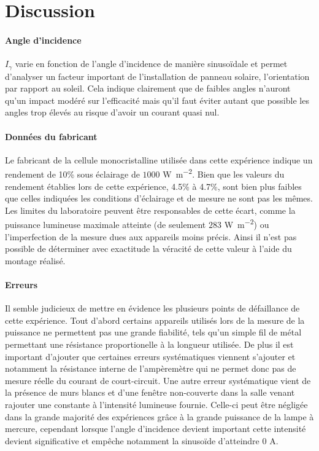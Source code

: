 \section{Discussion}

\paragraph{Angle d'incidence}
\(I_\gamma\) varie en fonction de l'angle d'incidence de manière sinusoïdale et permet d'analyser un facteur important de l'installation de panneau solaire, l'orientation par rapport au soleil. Cela indique clairement que de faibles angles n'auront qu'un impact modéré sur l'efficacité mais qu'il faut éviter autant que possible les angles trop élevés au risque d'avoir un courant quasi nul.

\paragraph{Données du fabricant}
Le fabricant de la cellule monocristalline utilisée dans cette expérience indique un rendement de 10\% sous éclairage de \(1000\) \unit{\watt \per \square \meter}. Bien que les valeurs du rendement établies lors de cette expérience, 4.5\% à 4.7\%, sont bien plus faibles que celles indiquées les conditions d'éclairage et de mesure ne sont pas les mêmes. Les limites du laboratoire peuvent être responsables de cette écart, comme la puissance lumineuse maximale atteinte (de seulement \(283\) \unit{\watt \per \square \meter}) ou l'imperfection de la mesure dues aux appareils moins précis. Ainsi il n'est pas possible de déterminer avec exactitude la véracité de cette valeur à l'aide du montage réalisé.

\paragraph{Erreurs}
Il semble judicieux de mettre en évidence les plusieurs points de défaillance de cette expérience. Tout d'abord certains appareils utilisés lors de la mesure de la puissance ne permettent pas une grande fiabilité, tels qu'un simple fil de métal permettant une résistance proportionelle à la longueur utilisée. De plus il est important d'ajouter que certaines erreurs systématiques viennent s'ajouter et notamment la résistance interne de l'ampèremètre qui ne permet donc pas de mesure réelle du courant de court-circuit. Une autre erreur systématique vient de la présence de murs blancs et d'une fenêtre non-couverte dans la salle venant rajouter une constante à l'intensité lumineuse fournie. Celle-ci peut être négligée dans la grande majorité des expériences grâce à la grande puissance de la lampe à mercure, cependant lorsque l'angle d'incidence devient important cette intensité devient significative et empêche notamment la sinusoïde d'atteindre \(0\) \unit{\ampere}.